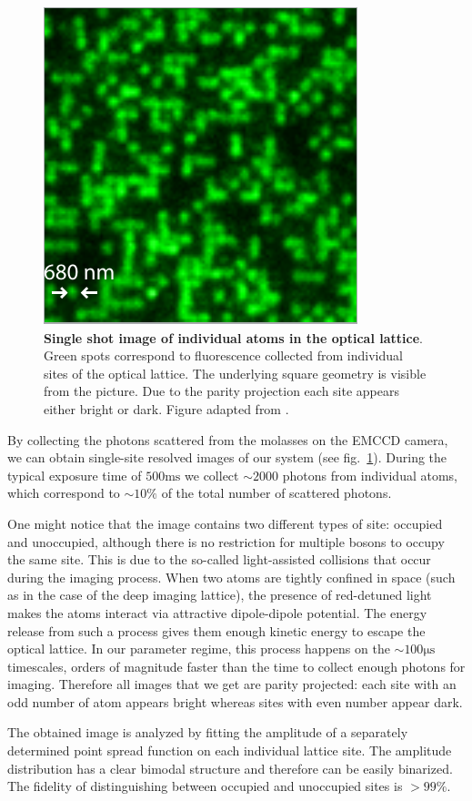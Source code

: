 \begin{figure}[t]
	\centering
	\includegraphics[scale=1]{figures/QGM_atoms.pdf}
	\caption{{\bf Single shot image of individual atoms in the optical lattice}. Green spots correspond to fluorescence collected from individual sites of the optical lattice. The underlying square geometry is visible from the picture. Due to the parity projection each site appears either bright or dark. Figure adapted from \cite{Bakr2009}.}
	\label{fig:QGM_atoms}
\end{figure}

By collecting the photons scattered from the molasses on the EMCCD camera, we can obtain single-site resolved images of our system (see fig.~\ref{fig:QGM_atoms}). During the typical exposure time of $500 \mathrm{ms}$ we collect $\sim 2000$ photons from individual atoms, which correspond to $\sim 10\%$ of the total number of scattered photons. 

One might notice that the image contains two different types of site: occupied and unoccupied, although there is no restriction for multiple bosons to occupy the same site. This is due to the so-called light-assisted collisions \cite{Suominen1996,Carpentier2013} that occur during the imaging process. When two atoms are tightly confined in space (such as in the case of the deep imaging lattice), the presence of red-detuned light makes the atoms interact via attractive dipole-dipole potential. The energy release from such a process gives them enough kinetic energy to escape the optical lattice. In our parameter regime, this process happens on the $\sim100 \mathrm{\mu s}$ timescales, orders of magnitude faster than the time to collect enough photons for imaging. Therefore all images that we get are parity projected: each site with an odd number of atom appears bright whereas sites with even number appear dark. 

The obtained image is analyzed by fitting the amplitude of a separately determined point spread function on each individual lattice site. The amplitude distribution has a clear bimodal structure \cite{Bakr2009} and therefore can be easily binarized. The fidelity of distinguishing between occupied and unoccupied sites is $>99\%$.